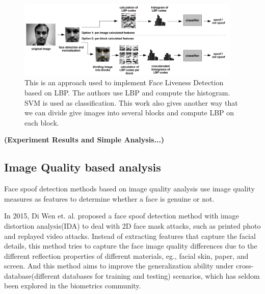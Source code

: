 \documentclass[journal]{IEEEtran}
\begin{document}
\begin{figure}[htbp]
\centering
\includegraphics[width=0.95\textwidth]{img/2-A-(1).png}
\caption{This is an approach \cite{chingovska2012effectiveness} used to implement Face Liveness Detection based on LBP. The authors use LBP and compute the histogram. SVM is used as classification. This work also gives another way that we can divide give images into several blocks and compute LBP on each block.}
\label{lbp_based_approach}
\end{figure}

\bigskip

\textbf{(Experiment Results and Simple Analysis...)}


\subsection{Image Quality based analysis}

Face spoof detection methods based on image quality analysis use image quality measures as features to determine whether a face is genuine or not.

In 2015, Di Wen et. al.\cite{wen2015face} proposed a face spoof detection method with image distortion analysis(IDA) to deal with 2D face mask attacks, such as printed photo and replayed video attacks. Instead of extracting features that capture the facial details, this method tries to capture the face image quality differences due to the different reflection properties of different materials, eg., facial skin, paper, and screen. And this method aims to improve the generalization ability under cross-database(different databases for training and testing) scenarios, which has seldom been explored in the biometrics community.
\end{document}
